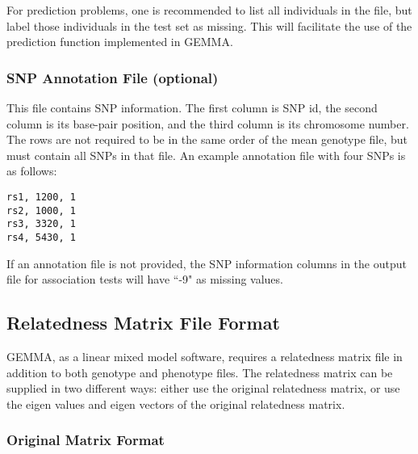\documentclass[11pt]{article}
\begin{document}
For prediction problems, one is recommended to list all individuals in
the file, but label those individuals in the test set as missing. This
will facilitate the use of the prediction function implemented in
GEMMA.

\subsubsection{SNP Annotation File (optional)}

This file contains SNP information. The first column is SNP id, the
second column is its base-pair position, and the third column is its
chromosome number. The rows are not required to be in the same order
of the mean genotype file, but must contain all SNPs in that file. An
example annotation file with four SNPs is as follows:
%
\begin{verbatim}
rs1, 1200, 1
rs2, 1000, 1
rs3, 3320, 1
rs4, 5430, 1
\end{verbatim}
%
If an annotation file is not provided, the SNP information columns in
the output file for association tests will have ``-9" as missing
values.

\subsection{Relatedness Matrix File Format}

GEMMA, as a linear mixed model software, requires a relatedness matrix
file in addition to both genotype and phenotype files. The relatedness
matrix can be supplied in two different ways: either use the original
relatedness matrix, or use the eigen values and eigen vectors of the
original relatedness matrix.

\subsubsection{Original Matrix Format}
\end{document}
